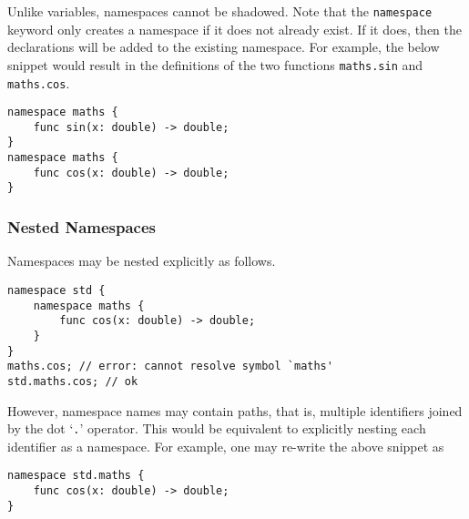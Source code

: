 Unlike variables, namespaces cannot be shadowed.
Note that the \texttt{namespace} keyword only creates a namespace if it does not already exist.
If it does, then the declarations will be added to the existing namespace.
For example, the below snippet would result in the definitions of the two functions \texttt{maths.sin} and \texttt{maths.cos}.

\begin{lstlisting}[language=CustomLang]
namespace maths {
    func sin(x: double) -> double;
}
namespace maths {
    func cos(x: double) -> double;
}
\end{lstlisting}

\subsubsection{Nested Namespaces}

Namespaces may be nested explicitly as follows.

\begin{lstlisting}[language=CustomLang]
namespace std {
    namespace maths {
        func cos(x: double) -> double;
    }
}
maths.cos; // error: cannot resolve symbol `maths'
std.maths.cos; // ok
\end{lstlisting}

However, namespace names may contain paths, that is, multiple identifiers joined by the dot `\texttt{.}' operator.
This would be equivalent to explicitly nesting each identifier as a namespace.
For example, one may re-write the above snippet as

\begin{lstlisting}[language=CustomLang]
namespace std.maths {
    func cos(x: double) -> double;
}
\end{lstlisting}
